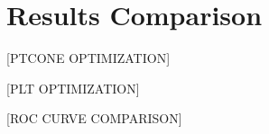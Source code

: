 \section{Results Comparison}\label{sec:results}

[PTCONE OPTIMIZATION]

[PLT OPTIMIZATION]

[ROC CURVE COMPARISON]